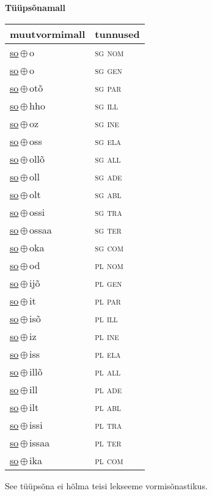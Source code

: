 

\vspace{3.5em}
\noindent \begin{minipage}{\textwidth}
\noindent \textbf{Tüüpsõnamall \,}\\

\begin{sideways}
\begin{tabular}{l l}
muutvormimall & tunnused \\
\hline
\underline{so}\,$\oplus$\,o & \textsc{ sg nom } \\
\underline{so}\,$\oplus$\,o & \textsc{ sg gen } \\
\underline{so}\,$\oplus$\,otõ & \textsc{ sg par } \\
\underline{so}\,$\oplus$\,hho & \textsc{ sg ill } \\
\underline{so}\,$\oplus$\,oz & \textsc{ sg ine } \\
\underline{so}\,$\oplus$\,oss & \textsc{ sg ela } \\
\underline{so}\,$\oplus$\,ollõ & \textsc{ sg all } \\
\underline{so}\,$\oplus$\,oll & \textsc{ sg ade } \\
\underline{so}\,$\oplus$\,olt & \textsc{ sg abl } \\
\underline{so}\,$\oplus$\,ossi & \textsc{ sg tra } \\
\underline{so}\,$\oplus$\,ossaa & \textsc{ sg ter } \\
\underline{so}\,$\oplus$\,oka & \textsc{ sg com } \\
\underline{so}\,$\oplus$\,od & \textsc{ pl nom } \\
\underline{so}\,$\oplus$\,ijõ & \textsc{ pl gen } \\
\underline{so}\,$\oplus$\,it & \textsc{ pl par } \\
\underline{so}\,$\oplus$\,isõ & \textsc{ pl ill } \\
\underline{so}\,$\oplus$\,iz & \textsc{ pl ine } \\
\underline{so}\,$\oplus$\,iss & \textsc{ pl ela } \\
\underline{so}\,$\oplus$\,illõ & \textsc{ pl all } \\
\underline{so}\,$\oplus$\,ill & \textsc{ pl ade } \\
\underline{so}\,$\oplus$\,ilt & \textsc{ pl abl } \\
\underline{so}\,$\oplus$\,issi & \textsc{ pl tra } \\
\underline{so}\,$\oplus$\,issaa & \textsc{ pl ter } \\
\underline{so}\,$\oplus$\,ika & \textsc{ pl com } \\
\end{tabular}
\end{sideways}
\label{tab:tüüpsõnamall-soo}

\end{minipage}

 
\vspace{1em}
\noindent See tüüpsõna ei hõlma teisi lekseeme vormi\-sõnastikus.
